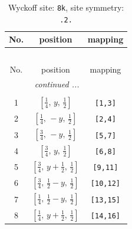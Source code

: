 \documentclass[fleqn,8pt]{jsarticle}
\begin{document}
\begin{longtable}{ccc}
\caption{Wyckoff site: {\tt 8k}, site symmetry: {\tt .2.}}
 \\
 \hline \hline
No. & position & mapping \\ \hline \endfirsthead

\multicolumn{2}{l}{\tablename\ \thetable{}} \\
 \hline \hline
No. & position & mapping \\ \hline \endhead

 \hline \hline
\multicolumn{2}{r}{\footnotesize\it continued ...} \\ \endfoot

 \hline \hline
\multicolumn{2}{r}{} \\ \endlastfoot

1 & $\left[ \frac{1}{4},\, y,\, \frac{1}{2} \right]$ & {\tt [1,3]} \\ \hline
2 & $\left[ \frac{1}{4},\, - y,\, \frac{1}{2} \right]$ & {\tt [2,4]} \\ \hline
3 & $\left[ \frac{3}{4},\, - y,\, \frac{1}{2} \right]$ & {\tt [5,7]} \\ \hline
4 & $\left[ \frac{3}{4},\, y,\, \frac{1}{2} \right]$ & {\tt [6,8]} \\ \hline
5 & $\left[ \frac{3}{4},\, y + \frac{1}{2},\, \frac{1}{2} \right]$ & {\tt [9,11]} \\ \hline
6 & $\left[ \frac{3}{4},\, \frac{1}{2} - y,\, \frac{1}{2} \right]$ & {\tt [10,12]} \\ \hline
7 & $\left[ \frac{1}{4},\, \frac{1}{2} - y,\, \frac{1}{2} \right]$ & {\tt [13,15]} \\ \hline
8 & $\left[ \frac{1}{4},\, y + \frac{1}{2},\, \frac{1}{2} \right]$ & {\tt [14,16]} \\
\end{longtable}
\renewcommand{\arraystretch}{1.2}
\end{document}
